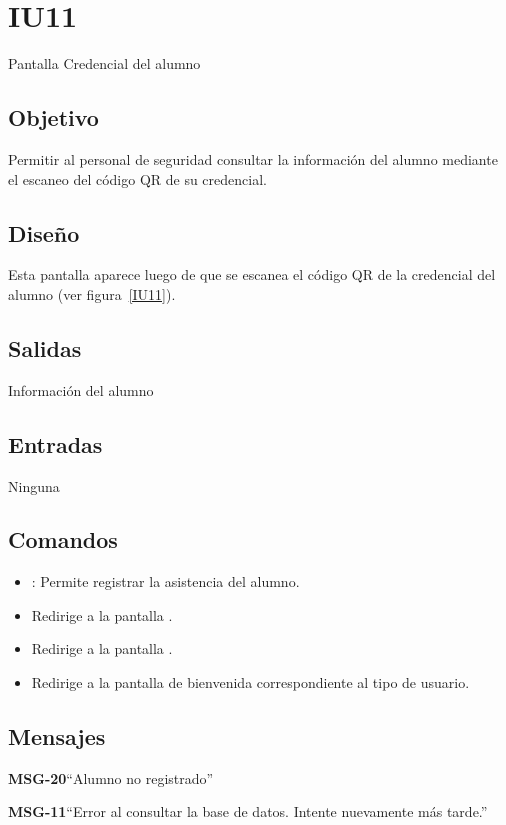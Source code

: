 \section{IU11}{Pantalla Credencial del alumno}

\subsection{Objetivo}
	Permitir al personal de seguridad consultar la información del alumno mediante el escaneo del código QR de su credencial.

\subsection{Diseño}
Esta pantalla aparece luego de que se escanea el código QR de la credencial del alumno  (ver figura~\ref{IU11}).
	


\subsection{Salidas}
	Información del alumno

\subsection{Entradas}
Ninguna

\subsection{Comandos}
\begin{itemize}
	\item {}: Permite registrar la asistencia del alumno.
	\item {} Redirige a la pantalla .
    \item {} Redirige a la pantalla .
    \item {} Redirige a la pantalla de bienvenida correspondiente al tipo de usuario.
\end{itemize}

\subsection{Mensajes}

\begin{Citemize}
	\item {\bf MSG-20}{``Alumno no registrado''}
	\item {\bf MSG-11}{``Error al consultar la base de datos. Intente nuevamente más tarde.''}
\end{Citemize}

